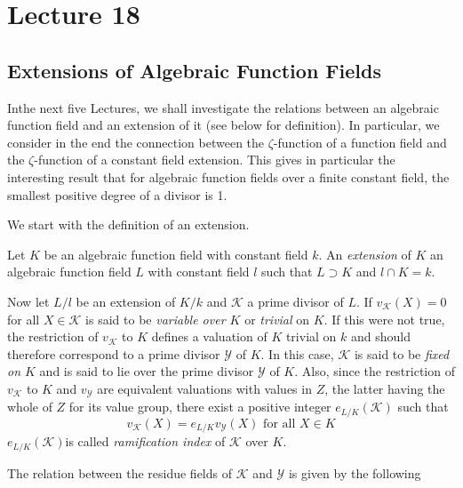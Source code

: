 \chapter{Lecture 18}\label{chap18}

\setcounter{section}{31}
\section{Extensions of Algebraic Function Fields}\label{chap18:sec32}%

In\pageoriginale the next five Lectures, we shall investigate the relations between
an algebraic function field and an extension of it (see below for
definition). In particular, we consider in the end the connection
between the $\zeta$-function of a function field and the
$\zeta$-function of a constant field extension. This gives in
particular the interesting result that for algebraic function fields
over a finite constant field, the smallest positive degree of a
divisor is 1. 

We start with the definition of an extension.

\begin{defi*}
  Let $K$ be an algebraic function field with constant field $k$. An
  \textit{extension} of $K$ an algebraic function field $L$ with
  constant field $l$ such that $L \supset K$ and $l \cap K=k$. 
\end{defi*}

Now let $L/l$ be an extension of $K/k$ and $\mathscr{K}$ a prime
divisor of $L$. If $v_\mathscr{K}(X)=0$ for all $X \in \mathscr{K}$
is said to be \textit{ variable over $K$} or \textit{trivial} on
$K$. If this were not true, the restriction of $v_\mathscr{K}$ to $K$
defines a valuation of $K$ trivial on $k$ and should therefore
correspond to a prime divisor $\mathscr{Y}$ of $K$. In this case,
$\mathscr{K}$ is said to be \textit{ fixed on $K$} and is said to lie
over the prime divisor $\mathscr{Y}$ of $K$. Also, since the
restriction of $v_\mathscr{K}$ to $K$ and $v_\mathscr{Y}$ are equivalent
valuations with values in $Z$, the latter having the whole of $Z$ for its
value group, there exist a positive integer $e_{L/K}(\mathscr{K})$
such that 
$$
v_\mathscr{K}(X)=e_{L/K}v_\mathscr{Y}(X) \text{ for all } X \in K
$$
$e_{L/K}(\mathscr{K})$\pageoriginale is called \textit{ ramification index} of
$\mathscr{K}$ over $K$. 

The relation between the residue fields of $\mathscr{K}$ and
$\mathscr{Y}$ is given by the following 

